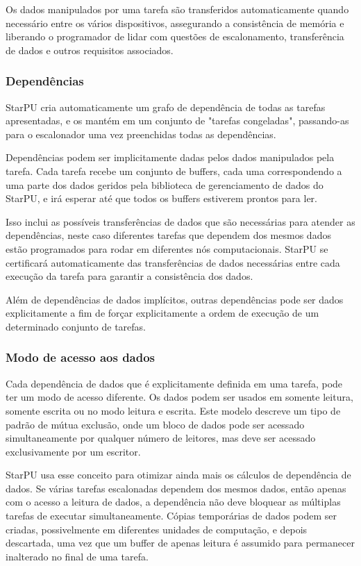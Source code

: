 Os dados manipulados por uma tarefa são transferidos automaticamente quando necessário entre os vários dispositivos, assegurando a consistência de memória e liberando o programador de lidar com questões de escalonamento, transferência de dados e outros requisitos associados.

\subsubsection{Dependências}

StarPU cria automaticamente um grafo de dependência de todas as tarefas apresentadas, e os mantém em um conjunto de "tarefas congeladas", passando-as para o escalonador uma vez preenchidas todas as dependências. 

Dependências podem ser implicitamente dadas pelos dados manipulados pela tarefa. Cada tarefa recebe um conjunto de buffers, cada uma correspondendo a uma parte dos dados geridos pela  biblioteca de gerenciamento de dados do StarPU, e irá esperar até que todos os buffers estiverem prontos para ler.

Isso inclui as possíveis transferências de dados que são necessárias para atender as dependências, neste caso diferentes tarefas que dependem dos mesmos dados estão programados para rodar em diferentes nós computacionais. StarPU se certificará automaticamente das transferências de dados necessárias entre cada execução da tarefa para garantir a consistência dos dados. 

Além de dependências de dados implícitos, outras dependências pode ser dados explicitamente a fim de forçar explicitamente a ordem de execução de um determinado conjunto de tarefas.


\subsubsection{Modo de acesso aos dados}

Cada dependência de dados que é explicitamente definida em uma tarefa, pode ter um modo de acesso diferente. Os dados podem ser usados em somente leitura, somente escrita ou no modo leitura e escrita. Este modelo descreve um tipo de padrão de mútua exclusão, onde um bloco de dados pode ser acessado simultaneamente por qualquer número de leitores, mas deve ser acessado exclusivamente por um escritor. 

StarPU usa esse conceito para otimizar ainda mais os cálculos de dependência de dados. Se várias tarefas escalonadas dependem dos mesmos dados, então apenas com o acesso a leitura de dados, a dependência não deve bloquear as múltiplas tarefas de executar simultaneamente. Cópias temporárias de dados podem ser criadas, possivelmente em diferentes unidades de computação, e depois descartada, uma vez que um buffer de apenas leitura é assumido para permanecer inalterado no final de uma tarefa.

